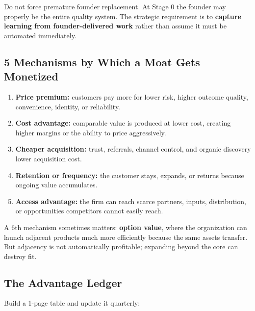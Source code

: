 Do not force premature founder replacement. At Stage 0 the founder may properly be the entire quality system. The strategic requirement is to \textbf{capture learning from founder-delivered work} rather than assume it must be automated immediately.

\subsection{5 Mechanisms by Which a Moat Gets Monetized}
\label{sec:five_mechanisms_moat_monetized}

\begin{enumerate}
    \item \textbf{Price premium:} customers pay more for lower risk, higher outcome quality, convenience, identity, or reliability.
    \item \textbf{Cost advantage:} comparable value is produced at lower cost, creating higher margins or the ability to price aggressively.
    \item \textbf{Cheaper acquisition:} trust, referrals, channel control, and organic discovery lower acquisition cost.
    \item \textbf{Retention or frequency:} the customer stays, expands, or returns because ongoing value accumulates.
    \item \textbf{Access advantage:} the firm can reach scarce partners, inputs, distribution, or opportunities competitors cannot easily reach.
\end{enumerate}

A 6th mechanism sometimes matters: \textbf{option value}, where the organization can launch adjacent products much more efficiently because the same assets transfer. But adjacency is not automatically profitable; expanding beyond the core can destroy fit.

\subsection{The Advantage Ledger}
\label{sec:advantage_ledger}

Build a 1-page table and update it quarterly:

